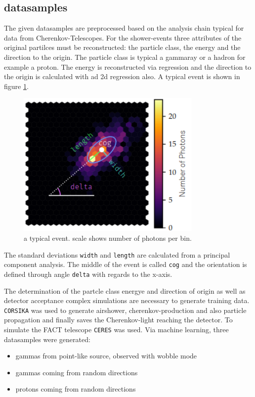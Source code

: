 \subsection{datasamples}
The given datasamples are preprocessed based on the analysis chain typical for data from Cherenkov-Telescopes.
For the shower-events three attributes of the original partilces must be reconstructed: the particle class, the energy and the direction to the origin.
The particle class is typical a gammaray or a hadron for example a proton. The energy is reconstructed via regression and the direction to the origin is calculated with ad 2d regression also.
A typical event is shown in figure \ref{fig:event}.
\begin{figure}
  \centering
  \includegraphics[width=0.8\textwidth]{fact_pics/event.png}
  \caption{a typical event. scale shows number of photons per bin.}
  \label{fig:event}
\end{figure}
The standard deviations \texttt{width} and \texttt{length} are calculated from a principal component analysis. The middle of the event is called \texttt{cog} and the orientation is defined through angle \texttt{delta} with regards to the x-axis.

The determination of the partcle class energye and direction of origin as well as detector acceptance complex simulations are necessary to generate training data.
\texttt{CORSIKA} was used to generate airshower, cherenkov-production and also particle propagation and finally saves the Cherenkov-light reaching the detector.
To simulate the FACT telescope \texttt{CERES} was used. Via machine learning, three datasamples were generated:
\begin{itemize}
  \item gammas from point-like source, observed with wobble mode
  \item gammas coming from random directions
  \item protons coming from random directions
\end{itemize}

